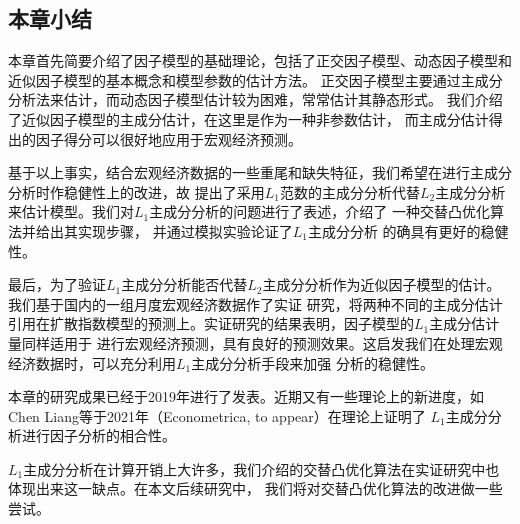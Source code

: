 \subsection{本章小结}
本章首先简要介绍了因子模型的基础理论，包括了正交因子模型、动态因子模型和近似因子模型的基本概念和模型参数的估计方法。
正交因子模型主要通过主成分分析法来估计，而动态因子模型估计较为困难，常常估计其静态形式。
我们介绍了近似因子模型的主成分估计，在这里是作为一种非参数估计，
而主成分估计得出的因子得分可以很好地应用于宏观经济预测。

基于以上事实，结合宏观经济数据的一些重尾和缺失特征，我们希望在进行主成分分析时作稳健性上的改进，故
提出了采用$L_1$范数的主成分分析代替$L_2$主成分分析来估计模型。我们对$L_1$主成分分析的问题进行了表述，介绍了
一种交替凸优化算法并给出其实现步骤，
并通过模拟实验论证了$L_1$主成分分析
的确具有更好的稳健性。

最后，为了验证$L_1$主成分分析能否代替$L_2$主成分分析作为近似因子模型的估计。我们基于国内的一组月度宏观经济数据作了实证
研究，将两种不同的主成分估计引用在扩散指数模型的预测上。实证研究的结果表明，因子模型的$L_1$主成分估计量同样适用于
进行宏观经济预测，具有良好的预测效果。这启发我们在处理宏观经济数据时，可以充分利用$L_1$主成分分析手段来加强
分析的稳健性。

本章的研究成果已经于2019年进行了发表\cite{孔新兵2019高维}。近期又有一些理论上的新进度，如Chen Liang等于2021年（Econometrica, to appear）在理论上证明了
$L_1$主成分分析进行因子分析的相合性。

$L_1$主成分分析在计算开销上大许多，我们介绍的交替凸优化算法在实证研究中也体现出来这一缺点。在本文后续研究中，
我们将对交替凸优化算法的改进做一些尝试。